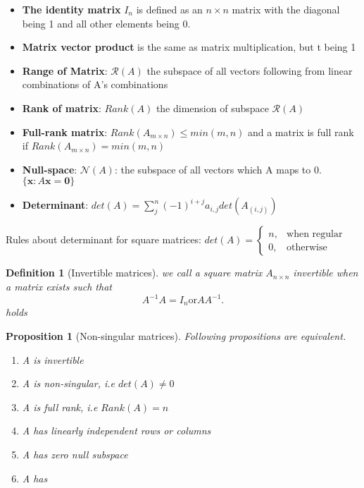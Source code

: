 \documentclass[11pt]{article}
\newtheorem{definition}[theorem]{Definition}
\newtheorem{proposition}[theorem]{Proposition}
\begin{document}
\begin{itemize}
    \item \textbf{The identity matrix} $I_{n}$  is defined as an $n \times n$ matrix with the diagonal being 1 and all other elements being 0.
    \item \textbf{Matrix vector product} is the same as matrix multiplication, but t being 1
    \item \textbf{Range of Matrix}: $\mathcal{R}(A)$ the subspace of all vectors following from linear combinations of A's combinations
    \item \textbf{Rank of matrix}: $Rank(A)$ the dimension of subspace $\mathcal{R}(A)$  
    \item \textbf{Full-rank matrix}: $Rank(A_{m\times n}) \leq min(m,n)$ and a matrix is full rank if $Rank(A_{m\times n}) = min(m,n)$
    \item \textbf{Null-space}: $\mathcal{N}(A)$: the subspace of all vectors which A maps to 0. $\{\textbf{x}: A\textbf{x} = \textbf{0} \} $  
    \item \textbf{Determinant}: $det(A) = \sum_{j}^{n} (-1)^{i+j}a_{i,j}det(A_{(i,j)})$  
\end{itemize}

Rules about determinant for square matrices:
$det(A) = \begin{cases}
    n, & \text{when regular}\\
    0, & \text{otherwise}
\end{cases}$

\begin{definition}[Invertible matrices] we call a square matrix $A_{n\times n}$ invertible when a matrix exists such that 
    \[
    A^{-1}A = I_n \text{or} AA^{-1}
    .\]    holds
    
\end{definition}

\begin{proposition}[Non-singular matrices] Following propositions are equivalent.
    \begin{enumerate}
        \item A is invertible
        \item A is non-singular, i.e $det(A)\neq 0$
        \item A is full rank, i.e $Rank(A) = n$
        \item A has linearly  independent rows or columns
        \item A has zero null subspace
        \item A has %
    \end{enumerate}
\end{proposition}
\end{document}
